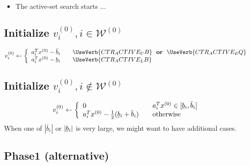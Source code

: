 \documentclass[12pt,a4paper]{article}
\newcommand{\abs}[1]{\left\lvert#1\right\rvert}
\newcommand{\ubar}[1]{\underaccent{\bar}{#1}}
\begin{document}
\begin{itemize}
\item The active-set search starts ...
\end{itemize}

\subsection{Initialize $v_i^{(0)}, i\in\mathcal{W}^{(0)}$}

\begin{align} \label{eq.v0_active}
  v_i^{(0)} \leftarrow \left\{ 
  \begin{array}{l l}
    a_i^Tx^{(0)} - \bar{b}_i & \quad \UseVerb{CTR_ACTIVE_UB} \,\,\,\, \text{\bf or} \,\,\,\, \UseVerb{CTR_ACTIVE_EQ} \\
    a_i^Tx^{(0)} - \ubar{b}_i & \quad \UseVerb{CTR_ACTIVE_LB}
  \end{array} \right.
\end{align}

\subsection{Initialize $v_i^{(0)}, i\not\in\mathcal{W}^{(0)}$}
%
\begin{align} \label{eq.v0_inactive}
  v_i^{(0)} \leftarrow \left\{ 
  \begin{array}{l l}
    0 & \quad a_i^Tx^{(0)} \in [\ubar{b}_i,\bar{b}_i] \\
    a^T_ix^{(0)} - \frac{1}{2}(\ubar{b}_i + \bar{b}_i) & \quad \text{otherwise}
  \end{array} \right.
\end{align}
%
When one of $\abs{\bar{b}_i}$ or $\abs{\ubar{b}_i}$ is very large, we might want to have additional
cases. %

\clearpage

\subsection{Phase1 (alternative)} \label{sec.phase1_v0}
\end{document}
